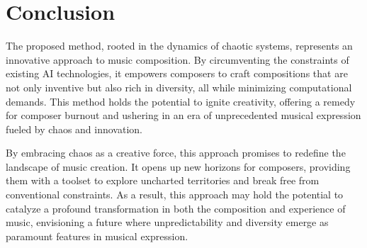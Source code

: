 \documentclass[11pt]{article}
\theoremstyle{definition}
\begin{document}
\section{Conclusion}
\label{sec: conclusion}
The proposed method, rooted in the dynamics of chaotic systems, represents an innovative approach to music composition. 
By circumventing the constraints of existing AI technologies, it empowers composers to craft compositions that are not only inventive but also rich in diversity, all while minimizing computational demands. 
This method holds the potential to ignite creativity, offering a remedy for composer burnout and ushering in an era of unprecedented musical expression fueled by chaos and innovation.

By embracing chaos as a creative force, this approach promises to redefine the landscape of music creation. 
It opens up new horizons for composers, providing them with a toolset to explore uncharted territories and break free from conventional constraints. 
As a result, this approach may hold the potential to catalyze a profound transformation in both the composition and experience of music, envisioning a future where unpredictability and diversity emerge as paramount features in musical expression.

\printbibliography
\end{document}
